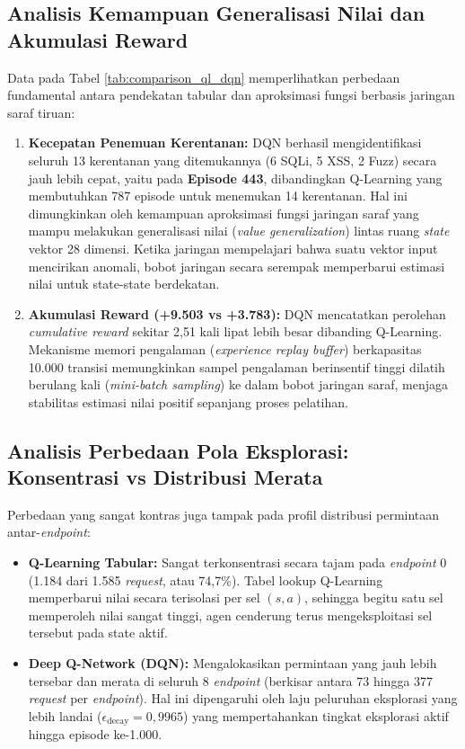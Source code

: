 \begin{enumerate}
\subsection{Analisis Kemampuan Generalisasi Nilai dan Akumulasi Reward}

Data pada Tabel \ref{tab:comparison_ql_dqn} memperlihatkan perbedaan fundamental antara pendekatan tabular dan aproksimasi fungsi berbasis jaringan saraf tiruan:
\begin{enumerate}
    \item \textbf{Kecepatan Penemuan Kerentanan:} DQN berhasil mengidentifikasi seluruh 13 kerentanan yang ditemukannya (6 SQLi, 5 XSS, 2 Fuzz) secara jauh lebih cepat, yaitu pada \textbf{Episode 443}, dibandingkan Q-Learning yang membutuhkan 787 episode untuk menemukan 14 kerentanan. Hal ini dimungkinkan oleh kemampuan aproksimasi fungsi jaringan saraf yang mampu melakukan generalisasi nilai (\textit{value generalization}) lintas ruang \textit{state} vektor 28 dimensi. Ketika jaringan mempelajari bahwa suatu vektor input mencirikan anomali, bobot jaringan secara serempak memperbarui estimasi nilai untuk state-state berdekatan. 
    \item \textbf{Akumulasi Reward (+9.503 vs +3.783):} DQN mencatatkan perolehan \textit{cumulative reward} sekitar 2,51 kali lipat lebih besar dibanding Q-Learning. Mekanisme memori pengalaman (\textit{experience replay buffer}) berkapasitas 10.000 transisi memungkinkan sampel pengalaman berinsentif tinggi dilatih berulang kali (\textit{mini-batch sampling}) ke dalam bobot jaringan saraf, menjaga stabilitas estimasi nilai positif sepanjang proses pelatihan. 
\end{enumerate}

\subsection{Analisis Perbedaan Pola Eksplorasi: Konsentrasi vs Distribusi Merata}

Perbedaan yang sangat kontras juga tampak pada profil distribusi permintaan antar-\textit{endpoint}:
\begin{itemize}
    \item \textbf{Q-Learning Tabular:} Sangat terkonsentrasi secara tajam pada \textit{endpoint} 0 (1.184 dari 1.585 \textit{request}, atau 74,7\%). Tabel lookup Q-Learning memperbarui nilai secara terisolasi per sel $(s, a)$, sehingga begitu satu sel memperoleh nilai sangat tinggi, agen cenderung terus mengeksploitasi sel tersebut pada state aktif. 
    \item \textbf{Deep Q-Network (DQN):} Mengalokasikan permintaan yang jauh lebih tersebar dan merata di seluruh 8 \textit{endpoint} (berkisar antara 73 hingga 377 \textit{request} per \textit{endpoint}). Hal ini dipengaruhi oleh laju peluruhan eksplorasi yang lebih landai ($\epsilon_{\text{decay}} = 0,9965$) yang mempertahankan tingkat eksplorasi aktif hingga episode ke-1.000. 
\end{itemize}


\end{enumerate}
